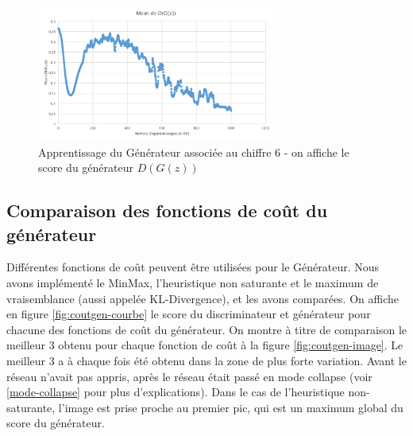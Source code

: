 \begin{figure}[H]
\begin{center}
\includegraphics[width=0.7\textwidth]{images/18_01_17-GAN/courbe.png}\caption{Apprentissage du Générateur associée au chiffre 6 - on affiche le score du générateur $D(G(z))$}
\end{center}
\end{figure}

\subsection{Comparaison des fonctions de coût du générateur}
Différentes fonctions de coût peuvent être utilisées pour le Générateur. Nous avons implémenté le MinMax, l'heuristique non saturante et le maximum de vraisemblance (aussi appelée KL-Divergence), et les avons comparées. On affiche en figure \ref{fig:coutgen-courbe} le score du discriminateur et générateur pour chacune des fonctions de coût du générateur. On montre à titre de comparaison le meilleur 3 obtenu pour chaque fonction de coût à la figure \ref{fig:coutgen-image}. Le meilleur 3 a à chaque fois été obtenu dans la zone de plus forte variation. Avant le réseau n'avait pas appris, après le réseau était passé en mode collapse (voir \ref{mode-collapse} pour plus d'explications). Dans le cas de l'heuristique non-saturante, l'image est prise proche au premier pic, qui est un maximum global du score du générateur.

